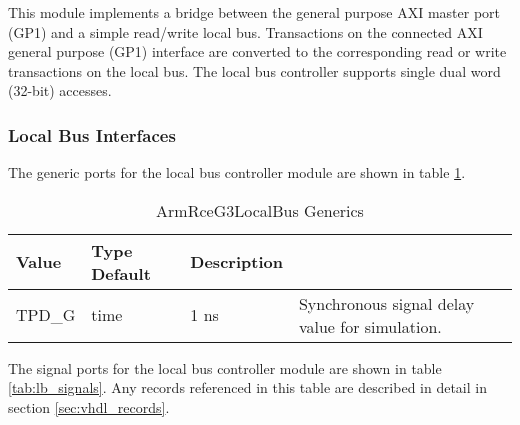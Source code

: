 \documentclass[11pt]{article}
\begin{document}
This module implements a bridge between the general purpose AXI master port (GP1) and a simple read/write local bus. 
Transactions on the connected AXI general purpose (GP1) interface are converted to the corresponding read or write transactions on the local bus. 
The local bus controller supports single dual word (32-bit) accesses.

\subsubsection{Local Bus Interfaces}

The generic ports for the local bus controller module are shown in table \ref{tab:lb_generics}.

\begin{table}[H]
\small
\centering
   \begin{tabular}{| l | l | l | l | }
      \hline \textbf{Value} & \textbf{Type} \textbf{Default} & \textbf{Description} \\
      \hline TPD\_G          & time    & 1 ns & Synchronous signal delay value for simulation.   \\
      \hline
   \end{tabular}
   \caption{ArmRceG3LocalBus Generics}
   \label{tab:lb_generics}
\end{table}

The signal ports for the local bus controller module are shown in table \ref{tab:lb_signals}.
Any records referenced in this table are described in detail in section \ref{sec:vhdl_records}. 
\end{document}
